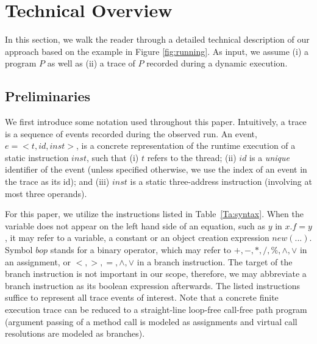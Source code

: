 \section{Technical Overview}\label{sec:overview}

In this section, we walk the reader through a detailed technical description of our approach based on the example in Figure \ref{fig:running}. 
%
As input, we assume (i) a program $P$ as well as (ii) a trace of $P$ recorded during a dynamic execution.



\subsection{Preliminaries}
We first introduce some notation used throughout this paper. Intuitively, a 
trace is a sequence of events recorded during the observed run. An 
event, $e=<t, id, inst>$, is a concrete representation of the runtime 
execution of a static instruction $inst$, such that (i) $t$ refers to the 
thread; (ii) $id$ is a {\em unique} identifier of the event (unless specified 
otherwise, we use the index of an event in the trace as its id); 
and (iii) $inst$ is a static three-address instruction (involving at most three operands).


For this paper, we utilize the instructions listed in 
Table~\ref{Ta:syntax}. When the variable does not appear on the left hand 
side of an equation, such as $y$ in $x.f=y$, it may refer to a variable, a 
constant or an object creation expression $new (...)$.  Symbol $bop$ stands 
for a binary operator, which may refer to $+, -, *, /, \%, \wedge, \vee$ in 
an assignment, or  $<, >, =, \wedge, \vee$ in a branch instruction. 
The target of the branch instruction is not important in our scope, 
therefore, we may abbreviate a branch instruction as its boolean expression 
afterwards. The listed instructions suffice to represent all trace events 
of interest. 
Note that 
a concrete finite execution trace can be reduced to a straight-line 
loop-free call-free path program  (argument passing of a method call 
is modeled as assignments and virtual call resolutions are modeled as 
branches). 

